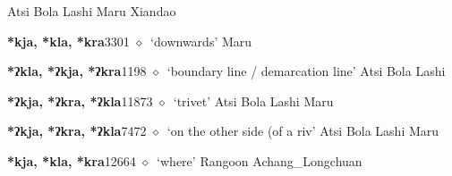 \begin{list}{}{\leftmargin=1.5em \itemindent=-1.5em}
         Atsi 
\hspace{1ex}
         Bola 
\hspace{1ex}
         Lashi 
\hspace{1ex}
         Maru 
\hspace{1ex}
         Xiandao 
  \item {\footnotesize \textbf{*kja, *kla, *kra}}{\tiny 3301}
\hspace{1ex}
         $\diamond$~`downwards'
         Maru 
  \item {\footnotesize \textbf{*ʔkla, *ʔkja, *ʔkra}}{\tiny 1198}
\hspace{1ex}
         $\diamond$~`boundary line / demarcation line'
         Atsi 
\hspace{1ex}
         Bola 
\hspace{1ex}
         Lashi 
  \item {\footnotesize \textbf{*ʔkja, *ʔkra, *ʔkla}}{\tiny 11873}
\hspace{1ex}
         $\diamond$~`trivet'
         Atsi 
\hspace{1ex}
         Bola 
\hspace{1ex}
         Lashi 
\hspace{1ex}
         Maru 
  \item {\footnotesize \textbf{*ʔkja, *ʔkra, *ʔkla}}{\tiny 7472}
\hspace{1ex}
         $\diamond$~`on the other side (of a riv'
         Atsi 
\hspace{1ex}
         Bola 
\hspace{1ex}
         Lashi 
\hspace{1ex}
         Maru 
  \item {\footnotesize \textbf{*kja, *kla, *kra}}{\tiny 12664}
\hspace{1ex}
         $\diamond$~`where'
         Rangoon 
\hspace{1ex}
         Achang\_Longchuan 

\end{list}
